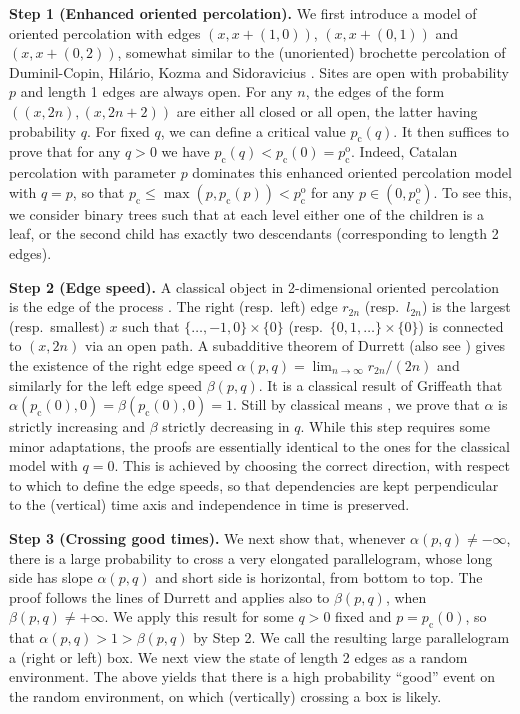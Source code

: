 \documentclass[pdflatex,sn-mathphys-num]{sn-jnl}%
\newcommand{\1}{{\ensuremath{\mathbf{1}}} }
\newcommand{\pc}{\ensuremath{p_{\mathrm{c}} }}
\newcommand{\pco}{\ensuremath{p_{\mathrm{c}}^{\mathrm{o}} }}
\theoremstyle{thmstyleone}%
\theoremstyle{thmstyletwo}%
\theoremstyle{thmstylethree}%
\begin{document}
{\bf Step 1 \rm{(Enhanced oriented percolation)}.}
We first introduce a model of oriented percolation with edges $(x,x+(1,0))$, $(x,x+(0,1))$ and $(x,x+(0,2))$, somewhat similar to the (unoriented) brochette percolation of Duminil-Copin, Hil\'ario, Kozma and Sidoravicius \cite{Duminil-Copin18b}. Sites are open with probability $p$ and length 1 edges are always open. For any $n$, the edges of the form $((x,2n),(x,2n+2))$ are either all closed or all open, the latter having probability $q$. For fixed $q$, we can define a critical value $\pc(q)$. It then suffices to prove that for any $q>0$ we have $\pc(q)<\pc(0)=\pco$. 
Indeed, Catalan percolation with parameter $p$ dominates this enhanced oriented percolation model with $q=p$, so that $\pc\le\max(p,\pc(p))<\pco$ for any $p\in(0,\pco)$. To see this, we consider binary trees such that at each level either one of the children is a leaf, or the second child has exactly two descendants (corresponding to length 2 edges). 

{\bf Step 2 \rm{(Edge speed)}.}
A classical object in 2-dimensional oriented percolation is the edge of the process \cite{Durrett84}. The right (resp.\ left) edge $r_{2n}$ (resp.\ $l_{2n}$) is the largest (resp.\ smallest) $x$ such that $\{\dots,-1,0\}\times \{0\}$ (resp.\ $\{0,1,\dots\}\times\{0\}$) is connected to $(x,2n)$ via an open path. A subadditive theorem of Durrett \cite{Durrett80} (also see \cite{Liggett05}) gives the existence of the right edge speed $\alpha(p,q)=\lim_{n\to\infty}r_{2n}/(2n)$ and similarly for the left edge speed $\beta(p,q)$. It is a classical result of Griffeath \cite{Griffeath81} that $\alpha(\pc(0),0)=\beta(\pc(0),0)=1$. Still by classical means \cite{Durrett80}, we prove that $\alpha$ is strictly increasing 
and $\beta$ strictly decreasing in $q$. While this step requires some minor adaptations, the proofs are essentially identical to the ones for the 
classical 
model with $q=0$. This is 
achieved by 
choosing the correct direction, with respect to which to define the edge speeds, so that dependencies are kept perpendicular to the (vertical) time axis and independence in time is preserved.

{\bf Step 3 \rm{(Crossing good times)}.}
We next show that, whenever $\alpha(p,q)\neq -\infty$, there is a large probability to cross a very elongated parallelogram, whose long side has slope $\alpha(p,q)$ and short side is horizontal, from bottom to top. The proof follows the lines of Durrett \cite{Durrett84} and applies also to $\beta(p,q)$, when $\beta(p,q)\neq +\infty$. We apply this result for some $q>0$ fixed and $p=\pc(0)$, so that $\alpha(p,q)>1>\beta(p,q)$ by Step 2. We call the resulting large parallelogram a (right or left) box. We next view the state of length 2 edges as a random environment. The above yields that there is a high probability ``good'' event on the random environment, on which (vertically) crossing a box is likely.
\end{document}
